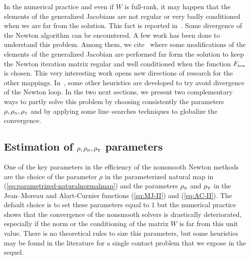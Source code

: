 In the numerical practice and even if $W$ is full-rank, it may happen that the elements of the generalized Jacobians are not regular or very badly conditioned when we are far from the solution. This fact is reported in~\cite{Alart1993,Alart95,Jourdan.Alart.ea98,Hueber.ea_SJSC2008,Koziara.Bicanic_CMAME2008}. Some divergence of the Newton algorithm can be encountered. A few work has been done to understand this problem. Among them, we cite~\cite{Hueber.ea_SJSC2008} where some modifications of the elements of the generalized Jacobian are performed far form the solution to keep the Newton iteration matrix regular and well conditioned when the function $F_{\hbox{\tiny{hsw}}}$ is chosen. This very interesting work opens new directions of research for the other mappings. In~\cite{Koziara.Bicanic_CMAME2008}, some other heuristics are developed to try avoid divergence of the Newton loop. In the two next sections, we present two complementary ways to partly solve this problem by choosing consistently the parameters $\rho, \rho_{\hbox{\tiny{N}}}, \rho_{\hbox{\tiny{T}}}$ and by applying some line--searches techniques to globalize the convergence.


\subsection{Estimation of $\rho, \rho_{\hbox{\tiny{N}}}, \rho_{\hbox{\tiny{T}}}$ parameters}

One of the key parameters in the efficiency of the nonsmooth Newton methods are the choice of the parameter $\rho$ in the parameterized natural map in (\ref{eq:parametrized-naturalnormalmap}) and the parameters  $\rho_{\hbox{\tiny{N}}}$ and $\rho_{\hbox{\tiny{T}}}$ in the Jean--Moreau and Alart-Curnier functions (\ref{eq:MJ-II}) and (\ref{eq:AC-II}). The default choice is to set these parameters equal to $1$ but the numerical practice shows  that the convergence of the nonsmooth solvers is drastically deteriorated, especially  if the norm or the conditioning of the matrix $W$ is far from this unit value. There is no theoretical rules to size this parameters, but some heuristics may be found in the literature for a single contact problem that we expose in the sequel.

